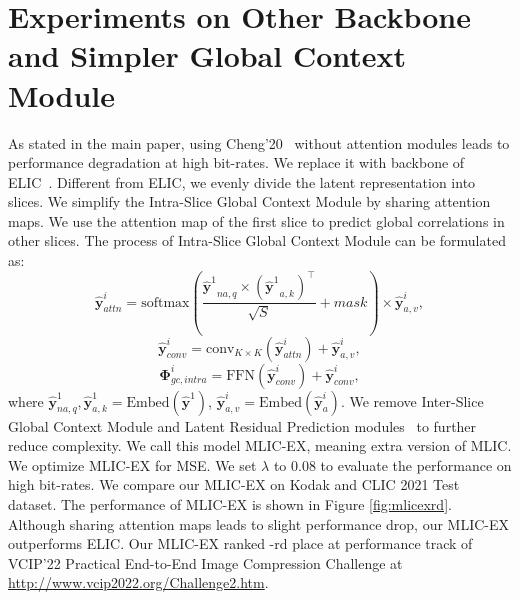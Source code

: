 \documentclass[sigconf]{acmart}
\begin{document}
\section{Experiments on Other Backbone and Simpler Global Context Module}
As stated in the main paper, using Cheng'20~\cite{DBLP:conf/cvpr/ChengSTK20}
without attention modules leads to performance degradation at high bit-rates.
We replace it with backbone of ELIC~\cite{He_2022_CVPR}. Different from ELIC,
we evenly divide the latent representation into slices.
We simplify the Intra-Slice Global Context Module by sharing attention maps.
We use the attention map of the first slice to predict global correlations in other slices.
The process of Intra-Slice Global Context Module can be formulated as:
\begin{equation}
    \hat {\boldsymbol{y}}^{i}_{attn} = \textrm{softmax}\left(\frac{{{\hat {\boldsymbol{y}}}^{1}}_{na,q} \times ({{\hat {\boldsymbol{y}}}^{1}}_{a,k})^\top}{\sqrt{S}} + mask\right) \times \hat {\boldsymbol{y}}^{i}_{a,v},
\end{equation}
\begin{equation}
    \hat {\boldsymbol{y}}^{i}_{conv} = \textrm{conv}_{K\times K}(\hat {\boldsymbol{y}}^{i}_{attn}) + \hat {\boldsymbol{y}}^{i}_{a,v},
\end{equation}
\begin{equation}
    {\boldsymbol{\Phi}}^i_{gc,intra} = \textrm{FFN}(\hat {\boldsymbol{y}}^{i}_{conv}) + \hat {\boldsymbol{y}}^{i}_{conv},
\end{equation}
where $\hat {\boldsymbol{y}}^{1}_{na,q}, \hat {\boldsymbol{y}}^{1}_{a,k} = \textrm{Embed}(\hat {\boldsymbol{y}}^{1})$, $\hat {\boldsymbol{y}}^{i}_{a,v} = \textrm{Embed}(\hat {\boldsymbol{y}}^i_{a})$.
We remove Inter-Slice Global Context Module and Latent Residual Prediction modules~\cite{DBLP:conf/icip/MinnenS20}
to further reduce complexity.
We call this model MLIC-EX, meaning extra version of MLIC.
We optimize MLIC-EX for MSE. We set $\lambda$ to $0.08$ to evaluate
the performance on high bit-rates. We compare our MLIC-EX on Kodak and CLIC 2021 Test dataset.
The performance of MLIC-EX is shown in Figure \ref{fig:mlicexrd}. Although
sharing attention maps leads to slight performance drop, our MLIC-EX outperforms ELIC.
Our MLIC-EX ranked {}-rd place at performance track of
VCIP'22 Practical End-to-End Image Compression Challenge at
\url{http://www.vcip2022.org/Challenge2.htm}.
\end{document}

